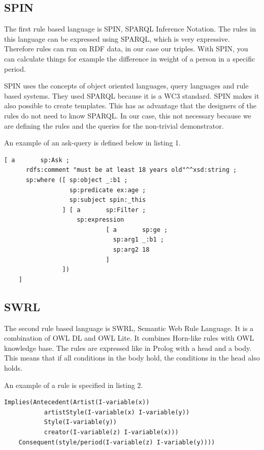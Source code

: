 \subsection*{SPIN}
The first rule based language is SPIN, SPARQL Inference Notation. The rules in this language can be expressed using SPARQL, which is very expressive. Therefore rules can run on RDF data, in our case our triples. With SPIN, you can calculate things for example the difference in weight of a person in a specific period. 

SPIN uses the concepts of object oriented languages, query languages and rule based systems. They used SPARQL because it is a WC3 standard. 
SPIN makes it also possible to create templates. This has as advantage that the designers of the rules do not need to know SPARQL. In our case, this not necessary because we are defining the rules and the queries for the non-trivial demonstrator. 

An example of an ask-query is defined below in listing 1.

\begin{lstlisting}[caption={Example of query using SPIN}]
[ a       sp:Ask ;
      rdfs:comment "must be at least 18 years old"^^xsd:string ;
      sp:where ([ sp:object _:b1 ;
                  sp:predicate ex:age ;
                  sp:subject spin:_this
                ] [ a       sp:Filter ;
                    sp:expression
                            [ a       sp:ge ;
                              sp:arg1 _:b1 ;
                              sp:arg2 18
                            ]
                ])
    ]
\end{lstlisting}
\subsection*{SWRL}
The second rule based language is SWRL, Semantic Web Rule Language. It is a combination of OWL DL and OWL Lite. It combines Horn-like rules with OWL knowledge base. The rules are expressed like in Prolog with a head and a body. This means that if all conditions in the body hold, the conditions in the head also holds. 

An example of a rule is specified in listing 2.
\begin{lstlisting}[caption={Example of query using SWRL}]
Implies(Antecedent(Artist(I-variable(x)) 
		   artistStyle(I-variable(x) I-variable(y))
		   Style(I-variable(y))
		   creator(I-variable(z) I-variable(x)))
	Consequent(style/period(I-variable(z) I-variable(y))))
\end{lstlisting}


